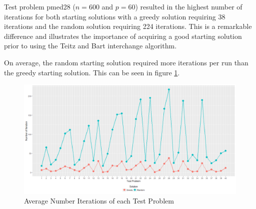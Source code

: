 \documentclass[11pt]{article}
\begin{document}
	Test problem pmed28 ($n = 600$ and $p = 60$) resulted in the highest number of iterations for both starting solutions with a greedy solution requiring 38 iterations and the random solution requiring 224 iterations.  This is a remarkable difference and illustrates the importance of acquiring a good starting solution prior to using the Teitz and Bart interchange algorithm.
	
	On average, the random starting solution required more iterations per run than the greedy starting solution.  This can be seen in figure \ref{TBiterations}.

		
		\begin{figure}[H]
			\begin{center}
				\includegraphics[width=14cm]{TBiterations.png}
				\caption{Average Number Iterations of each Test Problem}
				\label{TBiterations}
			\end{center}
		\end{figure}
\end{document}
